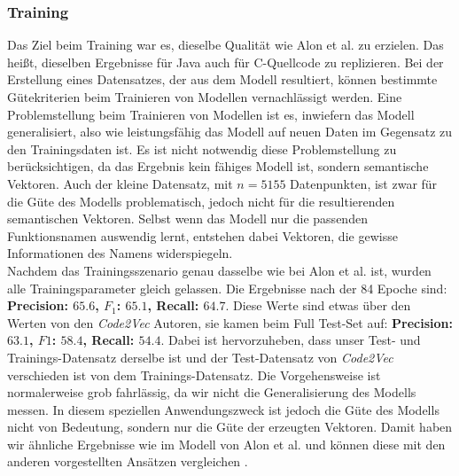 \documentclass[12pt,letterpaper,ngerman]{article}
\begin{document}
\subsubsection{Training}
Das Ziel beim Training war es, dieselbe Qualität wie Alon et al. zu erzielen. 
Das heißt, dieselben Ergebnisse für Java auch für C-Quellcode zu 
replizieren. Bei der Erstellung eines Datensatzes, der aus dem 
Modell resultiert, können bestimmte Gütekriterien beim Trainieren 
von Modellen vernachlässigt werden. Eine Problemstellung beim 
Trainieren von Modellen ist es, inwiefern das Modell generalisiert, 
also wie leistungsfähig das Modell auf neuen Daten im Gegensatz zu 
den Trainingsdaten ist.
Es ist nicht notwendig diese Problemstellung zu berücksichtigen,
da das 
Ergebnis kein fähiges Modell ist, sondern semantische Vektoren.
Auch der kleine Datensatz, mit $n = 5155 $ Datenpunkten, ist zwar
für die Güte des Modells problematisch, jedoch nicht für die
resultierenden semantischen Vektoren. Selbst wenn das Modell nur 
die passenden Funktionsnamen auswendig lernt, entstehen dabei
Vektoren, die gewisse Informationen des Namens widerspiegeln.\\
Nachdem das Trainingsszenario 
genau dasselbe wie bei Alon et al. ist, wurden alle
Trainingsparameter gleich 
gelassen. Die Ergebnisse nach der 84 Epoche sind: 
{\bf Precision: $65.6$, $F_1$: $65.1$,  Recall: $64.7$}. Diese Werte sind 
etwas über den Werten von den \textit{Code2Vec} Autoren, sie kamen beim 
Full Test-Set auf: {\bf Precision: $63.1$, $F1$: $58.4$,  Recall: $54.4$}. 
Dabei ist hervorzuheben, dass unser Test- und Trainings-Datensatz derselbe ist
und der Test-Datensatz von \textit{Code2Vec} verschieden ist von dem 
Trainings-Datensatz. Die Vorgehensweise ist normalerweise grob fahrlässig,
da wir nicht die Generalisierung des Modells messen. In diesem speziellen 
Anwendungszweck ist jedoch die Güte des Modells nicht von Bedeutung,
sondern nur die Güte der erzeugten Vektoren.
Damit haben wir ähnliche Ergebnisse wie im Modell von Alon et al.
und können diese mit den anderen vorgestellten Ansätzen vergleichen
\cite{code2vec}.
\end{document}

